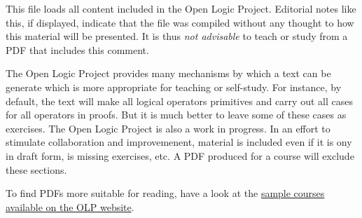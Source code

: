 \documentclass[../include/open-logic-part]{subfiles}
\begin{document}
\clearpage

\begin{editorial}
This file loads all content included in the Open Logic Project.
Editorial notes like this, if displayed, indicate that the file was
compiled without any thought to how this material will be presented.
It is thus \emph{not advisable} to teach or study from a PDF that
includes this comment.

The Open Logic Project provides many mechanisms by which a text can be
generate which is more appropriate for teaching or self-study.  For
instance, by default, the text will make all logical operators
primitives and carry out all cases for all operators in proofs.  But
it is much better to leave some of these cases as exercises. The Open
Logic Project is also a work in progress. In an effort to stimulate
collaboration and improvemenent, material is included even if it is
ony in draft form, is missing exercises, etc.  A PDF produced for a
course will exclude these sections.

To find PDFs more suitable for
reading, have a look at the
\href{http://people.ucalgary.ca/~rzach/static/open-logic/courses/}{sample
  courses available on the OLP website}.
\end{editorial}









\end{document}
